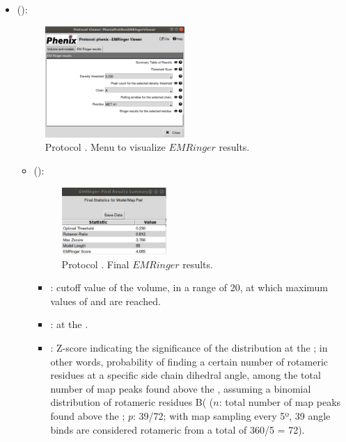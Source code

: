 \begin{itemize}
\begin{itemize}
     \item {} ():
     
     \begin{figure}[H]
     \centering 
     \captionsetup{width=.9\linewidth} 
     \includegraphics[width=0.50\textwidth]{Images_appendix/Fig141.pdf}
     \caption{Protocol . Menu to visualize $EMRinger$ results.}
     \label{fig:app_protocol_emringer_3}
    \end{figure}
      \begin{itemize}
        \item {} ():
        \begin{figure}[H]
         \centering 
         \captionsetup{width=.9\linewidth} 
         \includegraphics[width=0.40\textwidth]{Images_appendix/Fig142.pdf}
         \caption{Protocol . Final $EMRinger$ results.}
        \label{fig:app_protocol_emringer_4}
     \end{figure}
         \begin{itemize}
          \item {}:  cutoff value of the volume, in a range of 20, at which maximum values of  and  are reached. 
          \item {}:  at the .
          \item {}: Z-score indicating the significance of the distribution at the ; in other words, probability of finding a certain number of rotameric residues at a specific side chain dihedral angle, among the total number of map peaks found above the , assuming a binomial distribution of rotameric residues B( ($n$: total number of map peaks found above the ; $p$: 39/72; with map sampling every 5º, 39 angle binds are considered rotameric from a total of 360/5 = 72).

\end{itemize}
\end{itemize}
\end{itemize}
\end{itemize}
